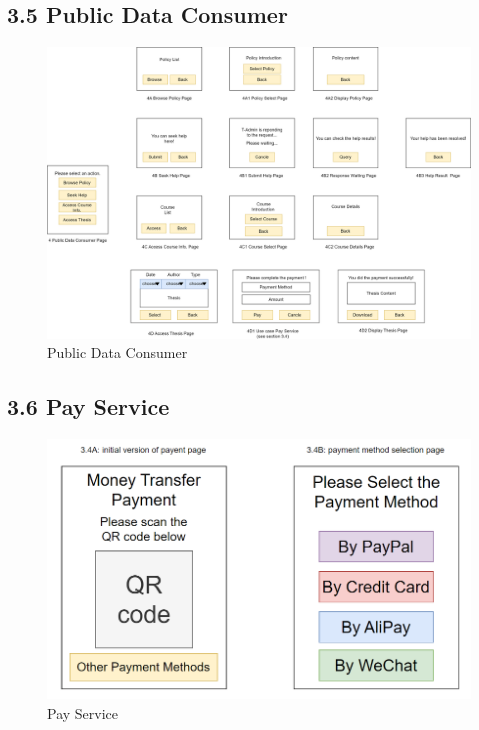 \documentclass[a4paper,12pt]{article}
\begin{document}
\subsection*{3.5 Public Data Consumer}
\begin{figure}[H]
    \begin{center}
        \includegraphics[width=\textwidth]{picture/WechatIMG1640.jpg}    
        \caption{Public Data Consumer}
        \label{fig:pay-service}
    \end{center}
\end{figure}

\subsection*{3.6 Pay Service}
\begin{figure}[H]
    \begin{center}
        \includegraphics[width=\textwidth]{picture/0123.png}
        \caption{Pay Service}
        \label{fig:access-thesis}
    \end{center}
\end{figure}
\end{document}
